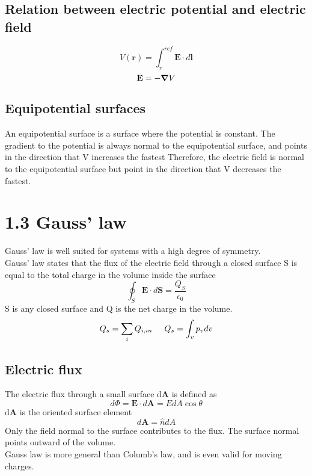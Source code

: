 \documentclass[
12pt, reprint, aip, onecolumn, notitlepage
]{revtex4-1}
\begin{document}
\subsection{Relation between electric potential and electric field}
\begin{equation}
	V(\mathbf{r}) = \int_{r}^{ref}\mathbf{E} \cdot d\mathbf{l}
\end{equation}
\begin{equation}
	\mathbf{E} = -\grad{V}
\end{equation}
\subsection{Equipotential surfaces}
An equipotential surface is a surface where the potential is constant. The gradient to the potential is always normal to the equipotential surface, and points in the direction that V increases the fastest  Therefore, the electric field is normal to the equipotential surface but point in the direction that V decreases the fastest.

\section{1.3 Gauss' law}
Gauss' law is well suited for systems with a high degree of symmetry.\\
Gauss' law states that the flux of the electric field through a closed surface S is equal to the total charge in the volume inside the surface
\begin{equation}
	\oint_S \mathbf{E} \cdot d\mathbf{S} = \dfrac{Q_S}{\epsilon_0}
\end{equation}
S is any closed surface and Q is the net charge in the volume.
\begin{equation}
	Q_s = \sum_i Q_{i,in} \hspace{5mm} Q_s = \int_v p_v dv
\end{equation}
\subsection{Electric flux}
The electric flux through a small surface d$\mathbf{A}$ is defined as 
\begin{equation}
	d\Phi = \mathbf{E}\cdot d\mathbf{A} = EdA\cos\theta
\end{equation}
d$\mathbf{A}$ is the oriented surface element
\begin{equation}
	d\mathbf{A} = \hat{n}dA 
\end{equation}
Only the field normal to the surface contributes to the flux. The surface normal points outward of the volume.\\
Gauss law is more general than Columb's law, and is even valid for moving charges. 
\end{document}
